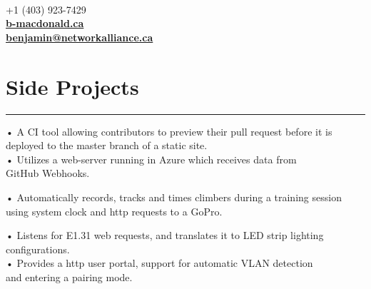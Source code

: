 \documentclass[]{resume}
\begin{document}
\begin{minipage}[t]{0.66\textwidth} 
\descript{}
\hspace*{0pt}\hfill    \\
\hspace*{0pt}\hfill    \\
\hspace*{0pt}\hfill    \\
\hspace*{0pt}\hfill +1 (403) 923-7429 \\
\hspace*{0pt}\hfill \textbf{\href{b-macdonald.ca}{b-macdonald.ca}} \\
\hspace*{0pt}\hfill \textbf{\href{mailto:benjamin@networkalliance.ca}{benjamin@networkalliance.ca}} \\
\section{Side Projects}
\noindent\rule{12.5cm}{0.4pt}
\noindent
\hspace{3em}%
\begin{minipage}{0.85\textwidth\vspace{5pt}}
• A CI tool allowing contributors to preview their pull request before it is deployed to the master branch of a static site.\\
• Utilizes a web-server running in Azure which receives data from\\GitHub Webhooks.
\end{minipage}
\noindent
\hspace{3em}%
\begin{minipage}{0.85\textwidth\vspace{5pt}}
• Automatically records, tracks and times climbers during a training session using system clock and http requests to a GoPro.
\end{minipage}
\noindent
\hspace{3em}%
\begin{minipage}{0.85\textwidth\vspace{5pt}}
• Listens for E1.31 web requests, and translates it to LED strip lighting configurations.\\
• Provides a http user portal, support for automatic VLAN detection\\and entering a pairing mode.
\end{minipage}

\end{minipage}
\end{document}

